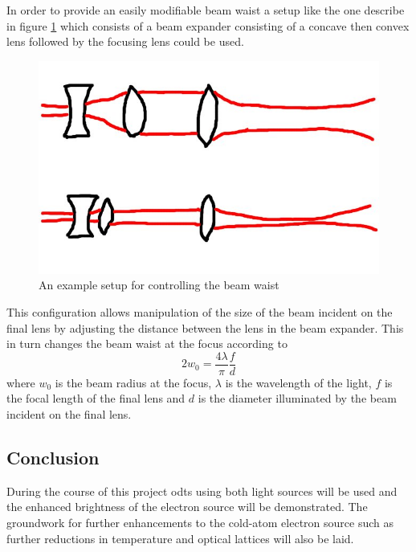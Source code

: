 In order to provide an easily modifiable beam waist a setup like the one describe in figure \ref{figs/MOT.pdf} which consists of a beam expander consisting of a concave then convex lens followed by the focusing lens could be used.

\begin{figure}[h]
	\centering
	\includegraphics[scale=0.32]{figs/waistcontrol.jpg}
	\caption[Title]{An example setup for controlling the beam waist}
	\label{figs/MOT.pdf}
\end{figure}

This configuration allows manipulation of the size of the beam incident on the final lens by adjusting the distance between the lens in the beam expander. This in turn changes the beam waist at the focus according to
\begin{equation}
2w_0=\frac{4\lambda}{\pi}\frac{f}{d}
\end{equation}
where $w_0$ is the beam radius at the focus, $\lambda$ is the wavelength of the light, $f$ is the focal length of the final lens and $d$ is the diameter illuminated by the beam incident on the final lens.

\subsection{Conclusion}
During the course of this project \glspl{odt} using both light sources will be used and the enhanced brightness of the electron source will be demonstrated. The groundwork for further enhancements to the cold-atom electron source such as further reductions in temperature and optical lattices will also be laid.
